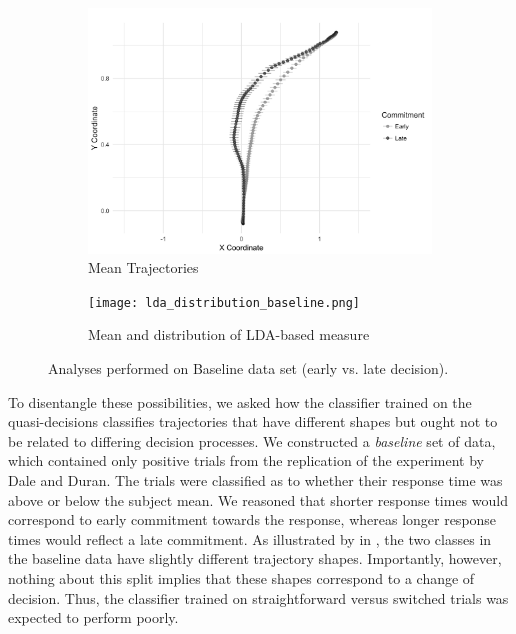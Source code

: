 \documentclass[draft]{article}
\begin{document}
\begin{figure}
\centering
\begin{subfigure}[b]{0.45\textwidth}
\includegraphics[width=\textwidth]{TrajectoriesBaseline.png}
\caption{Mean Trajectories}\label{fig:baseline-traj}
\end{subfigure}
\begin{subfigure}[b]{0.45\textwidth}
\texttt{[image: lda\_distribution\_baseline.png]}
\caption{Mean and distribution of LDA-based measure}\label{fig:baseline-lda}
\end{subfigure}
\caption{Analyses performed on Baseline data set (early vs. late decision). }
\end{figure}

To disentangle these possibilities, we asked how the classifier trained on the quasi-decisions classifies trajectories that have different shapes but ought not to be related to differing decision processes.
We  constructed a \emph{baseline} set of data, which contained only positive trials from the replication of the experiment by Dale and Duran. The trials were classified as to whether their response time was above or below the subject mean. We reasoned that shorter response times would correspond to early commitment towards the response, whereas longer response times would reflect a late commitment. As illustrated by in , the two classes in the baseline data have slightly different trajectory shapes. Importantly, however, nothing about this split implies that these shapes correspond to a change of decision. Thus, the classifier trained on straightforward versus switched trials was expected to perform poorly.
\end{document}
